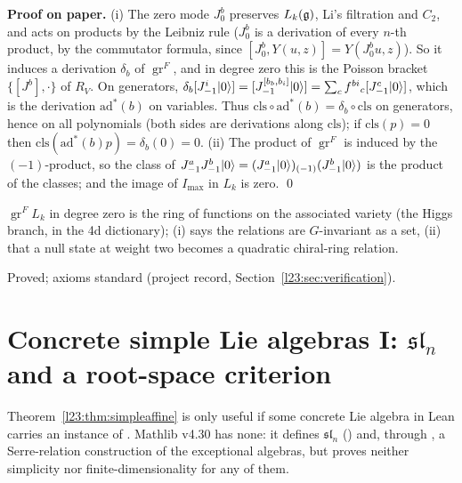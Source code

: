 \textbf{Proof on paper.} (i) The zero mode $J^b_0$ preserves $L_k(\mathfrak g)$, Li's filtration and $C_2$, and acts on products by the
Leibniz rule ($J^b_0$ is a derivation of every $n$-th product, by the commutator formula, since $[J^b_0,Y(u,z)]=Y(J^b_0u,z)$). So it
induces a derivation $\delta_b$ of $\operatorname{gr}^F$, and in degree zero this is the Poisson bracket $\{[J^b],\cdot\}$ of $R_V$. On
generators, $\delta_b[J^i_{-1}|0\rangle]=[J^{[b_b,b_i]}_{-1}|0\rangle]=\sum_cf^{bi}{}_c[J^c_{-1}|0\rangle]$, which is the derivation
$\mathrm{ad}^*(b)$ on variables. Thus $\mathrm{cls}\circ\mathrm{ad}^*(b)=\delta_b\circ\mathrm{cls}$ on generators, hence on all
polynomials (both sides are derivations along $\mathrm{cls}$); if $\mathrm{cls}(p)=0$ then $\mathrm{cls}(\mathrm{ad}^*(b)p)=\delta_b(0)=0$.
(ii) The product of $\operatorname{gr}^F$ is induced by the $(-1)$-product, so the class of $J^a_{-1}J^b_{-1}|0\rangle=(J^a_{-1}|0\rangle)_{(-1)}(J^b_{-1}|0\rangle)$
is the product of the classes; and the image of $I_{\max}$ in $L_k$ is zero. \qed

\begin{physics}
$\operatorname{gr}^F L_k$ in degree zero is the ring of functions on the associated variety (the Higgs branch, in the 4d
dictionary); (i) says the relations are $G$-invariant as a set, (ii) that a null state at weight two becomes a quadratic
chiral-ring relation.
\end{physics}

\begin{status}
Proved; axioms standard (project record, Section~\ref{l23:sec:verification}).
\end{status}

\section{Concrete simple Lie algebras I: \texorpdfstring{$\mathfrak{sl}_n$}{sl(n)} and a root-space criterion}\label{l23:sec:sln}

Theorem~\ref{l23:thm:simpleaffine} is only useful if some concrete Lie algebra in Lean carries an instance of
. Mathlib v4.30 has none: it defines $\mathfrak{sl}_n$
() and, through , a Serre-relation construction of the exceptional
algebras, but proves neither simplicity nor finite-dimensionality for any of them.

